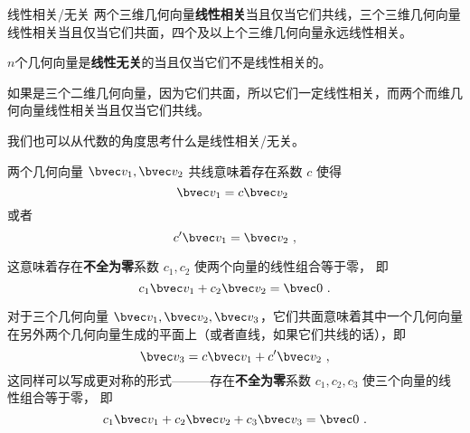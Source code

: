 
\begin{issues}
\issueTODO
\end{issues}


% 

\begin{definition}{线性相关/无关}\label{def_linDpe_1}
两个三维几何向量\textbf{线性相关}当且仅当它们共线，三个三维几何向量线性相关当且仅当它们共面，四个及以上个三维几何向量永远线性相关。

$n$个几何向量是\textbf{线性无关}的当且仅当它们不是线性相关的。
\end{definition}

如果是三个二维几何向量，因为它们共面，所以它们一定线性相关，而两个而维几何向量线性相关当且仅当它们共线。

我们也可以从代数的角度思考什么是线性相关/无关。

两个几何向量 $\bvec v_1, \bvec v_2$ 共线意味着存在系数 $c$ 使得
$$
\bvec v_1 = c \bvec v_2~
$$
或者
$$
c' \bvec v_1 = \bvec v_2~,
$$

这意味着存在\textbf{不全为零}系数 $c_1, c_2$ 使两个向量的线性组合等于零， 即
\begin{equation}\label{eq_linDpe_2}
c_1 \bvec v_1 + c_2 \bvec v_2 = \bvec 0~.
\end{equation}

对于三个几何向量 $\bvec v_1, \bvec v_2, \bvec v_3$，它们共面意味着其中一个几何向量在另外两个几何向量生成的平面上（或者直线，如果它们共线的话），即
\begin{equation}
\bvec v_3 = c \bvec v_1 + c' \bvec v_2~,
\end{equation}
这同样可以写成更对称的形式———存在\textbf{不全为零}系数 $c_1, c_2, c_3$ 使三个向量的线性组合等于零， 即
\begin{equation}
c_1 \bvec v_1 + c_2 \bvec v_2 + c_3 \bvec v_3 = \bvec 0~.
\end{equation}


